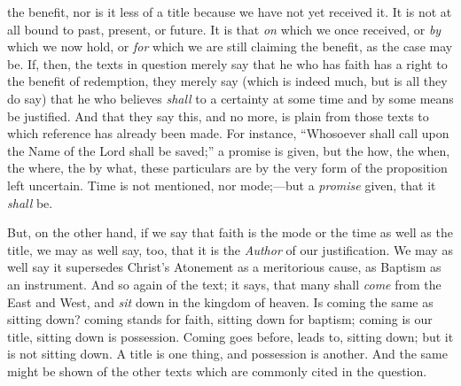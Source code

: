 the benefit, nor is it less of a title because we have not yet
received it. It is not at all bound to past, present, or future. It is
that \emph{on} which we once received, or \emph{by} which we now hold,
or \emph{for} which we are still claiming the benefit, as the case may
be. If, then, the texts in question merely say that he who has faith
has a right to the benefit of redemption, they merely say (which is
indeed much, but is all they do say) that he who believes \emph{shall}
to a certainty at some time and by some means be justified. And that
they say this, and no more, is plain from those texts to which reference has already been made. For instance, ``Whosoever shall
call upon the Name of the Lord shall be saved;'' a promise is
given, but the how, the when, the where, the by what, these
particulars are by the very form of the proposition left uncertain.
Time is not mentioned, nor mode;—but a \emph{promise} given, that it
\emph{shall} be.

But, on the other hand, if we say that faith is the mode or the
time as well as the title, we may as well say, too, that it is the \emph{Author}
of our justification. We may as well say it supersedes Christ's
Atonement as a meritorious cause, as Baptism as an instrument. And so
again of the text; it says, that many shall \emph{come} from the East
and West, and \emph{sit} down in the kingdom of heaven. Is coming the
same as sitting down? coming stands for faith, sitting down for
baptism; coming is our title, sitting down is possession. Coming goes
before, leads to, sitting down; but it is not sitting down. A title is
one thing, and possession is another. And the same might be shown of
the other texts which are commonly cited in the question.

